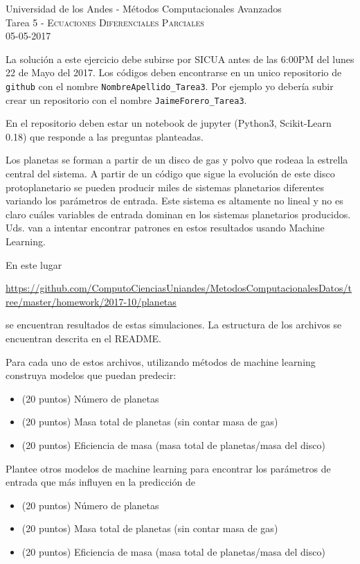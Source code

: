 \documentclass[11pt,letterpaper]{exam}
\begin{document}
\begin{center}
{\Large Universidad de los Andes - M\'etodos Computacionales Avanzados} \\
Tarea 5 - \textsc{Ecuaciones Diferenciales Parciales}\\
05-05-2017\\
\end{center}

\vspace{0.3cm}


\noindent
La soluci\'on a este ejercicio debe subirse por SICUA antes de las 6:00PM
del lunes 22 de Mayo del 2017. 
Los c\'odigos deben encontrarse en un unico repositorio de \verb'github'
con el nombre \verb"NombreApellido_Tarea3". Por ejemplo yo deber\'ia
subir crear un repositorio con el nombre \verb"JaimeForero_Tarea3". 

\noindent
En el repositorio deben estar un notebook de jupyter (Python3,
Scikit-Learn 0.18) que responde a las preguntas planteadas.
\vspace{0.3cm}

\begin{questions}

Los planetas se forman a partir de un disco de gas y polvo que rodeaa
la estrella central del sistema. A partir de un c\'odigo que sigue la
evoluci\'on de este disco protoplanetario se pueden producir miles de
sistemas planetarios diferentes variando los par\'ametros de
entrada. Este sistema es altamente no lineal y no es claro cu\'ales
variables de entrada dominan en los sistemas planetarios producidos.
Uds. van a intentar encontrar patrones en estos resultados usando
Machine Learning.

En este lugar

\url{https://github.com/ComputoCienciasUniandes/MetodosComputacionalesDatos/tree/master/homework/2017-10/planetas}

se encuentran resultados de estas simulaciones. La estructura de los
archivos se encuentran descrita en el README.

Para cada uno de estos archivos, utilizando m\'etodos de machine
learning construya modelos que puedan predecir:

\begin{itemize}
\item (20 puntos) N\'umero de planetas
\item (20 puntos) Masa total de planetas (sin contar masa de gas)
\item (20 puntos) Eficiencia de masa (masa total de planetas/masa del disco)
\end{itemize}

Plantee otros modelos de machine learning para encontrar los
  par\'ametros de entrada que m\'as influyen en la predicci\'on de 
\begin{itemize}
\item (20 puntos) N\'umero de planetas
\item (20 puntos) Masa total de planetas (sin contar masa de gas)
\item (20 puntos) Eficiencia de masa (masa total de planetas/masa del
  disco)
\end{itemize}
\end{questions}
\end{document}
